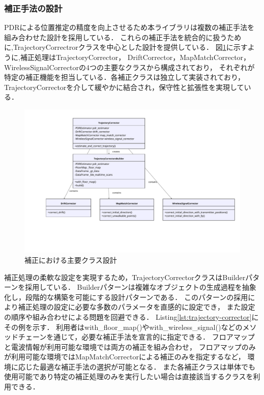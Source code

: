 
\subsubsection{補正手法の設計}


PDRによる位置推定の精度を向上させるため本ライブラリは複数の補正手法を
組み合わせた設計を採用している．
これらの補正手法を統合的に扱うために,TrajectoryCorrectrorクラスを中心とした設計を提供している．
図\ref{fig:corrector-class}に示すように,補正処理はTrajectoryCorrector，
DriftCorrector，MapMatchCorrector，WirelessSignalCorrectorの4つの主要なクラスから構成されており，
それぞれが特定の補正機能を担当している．各補正クラスは独立して実装されており，
TrajectoryCorrectorを介して緩やかに結合され，保守性と拡張性を実現している．

\begin{figure}[H]
    \centering
    \includegraphics[width=\linewidth]{../image/trajectory_corrector.pdf}
    \caption{補正における主要クラス設計}
    \label{fig:corrector-class}
\end{figure}

補正処理の柔軟な設定を実現するため，TrajectoryCorrectorクラスはBuilderパターンを採用している．
Builderパターンは複雑なオブジェクトの生成過程を抽象化し，段階的な構築を可能にする設計パターンである．
このパターンの採用により補正処理の設定に必要な多数のパラメータを直感的に設定でき，
また設定の順序や組み合わせによる問題を回避できる．
Listing\ref{lst:trajectory-corrector}にその例を示す．
利用者はwith\_floor\_map()やwith\_wireless\_signal()などのメソッドチェーンを通じて，必要な補正手法を宣言的に指定できる． 
フロアマップと電波情報が利用可能な環境では両方の補正を組み合わせ，
フロアマップのみが利用可能な環境ではMapMatchCorrectorによる補正のみを指定するなど，
環境に応じた最適な補正手法の選択が可能となる．
また各補正クラスは単体でも使用可能であり特定の補正処理のみを実行したい場合は直接該当するクラスを利用できる．

